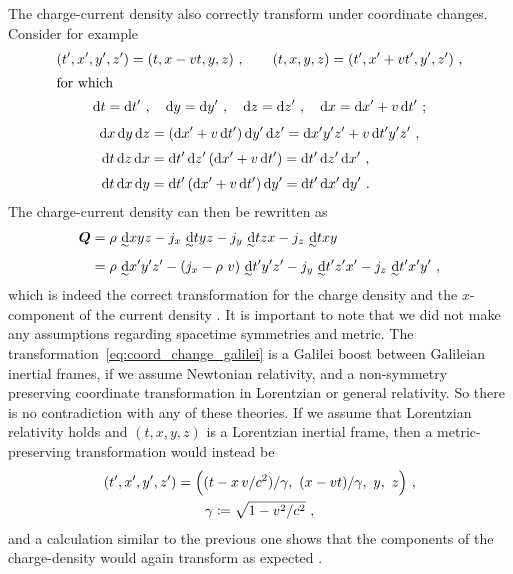 \documentclass[\ifafour a4paper,12pt,\else a5paper,10pt,\fi%
onecolumn,oneside,article,%
british%
]{memoir}
\theoremstyle{remark}
\theoremstyle{innote}
\newcommand*{\di}{\mathrm{d}}%
\newcommand*{\defd}{\coloneqq}
\renewcommand*{\|}[1][]{\nonscript\:#1\vert\nonscript\:\mathopen{}}
\newcommand*{\eqn}{eq.}%
\newcommand*{\eqns}{eqs}%
\newcommand*{\tw}[2][\scriptstyle\sim]{\smash[b]{\underset{\mathclap{{}^{#1}}}{#2}}}
\newcommand*{\ti}[1][\scriptstyle\sim]{\tw[#1]{\di}}
\begin{document}
The charge-current density also correctly transform under coordinate changes. Consider for example
\begin{gather}
  \label{eq:coord_change_galilei}
  (t', x', y', z') = (t, x-vt, y, z) \ ,
  \qquad
  (t, x, y, z) = (t', x'+vt', y', z') \ ,
  \\
  \shortintertext{for which}
  \begin{gathered}
  \di t = \di t' \ , \quad
  \di y = \di y' \ , \quad
  \di z = \di z' \ , \quad
  \di x = \di x' + v\,\di t' \ ;
\end{gathered}
\\[\jot]
\begin{aligned}
  \di x\, \di y\, \di z &=
  (\di x' + v\,\di t')\,\di y'\,\di z' =
  \di x'y'z' + v\,\di t'y'z' \ ,
  \\[\jot]
  \di t\, \di z\, \di x &=
  \di t'\, \di z'\, (\di x' + v\,\di t') =
  \di t'\, \di z'\, \di x' \ ,
  \\[\jot]
  \di t\, \di x\, \di y &=
  \di t'\, (\di x' + v\,\di t')\, \di y' =
  \di t'\, \di x'\, \di y' \ .
\end{aligned}
\end{gather}
The charge-current density can then be rewritten as
\begin{equation}
  \label{eq:charge-current_coordtransf}
  \begin{split}
\bm{Q} &=  \rho\ \ti xyz
  - j_{x}\ \ti tyz - j_{y}\ \ti tzx - j_{z}\ \ti txy
  \\[2\jot]
  &=\rho\ \ti x'y'z'
  - (j_{x} - \rho\ v)\ \ti t'y'z'
  - j_{y}\ \ti t'z'x' - j_{z}\ \ti t'x'y' \ ,
\end{split}
\end{equation}
which is indeed the correct transformation for the charge density and the $x$-component of the current density \autocites[\eqn~(5.8)]{kovetz2000}. It is important to note that we did not make any assumptions regarding spacetime symmetries and metric. The transformation~\eqref{eq:coord_change_galilei} is a Galilei boost between Galileian inertial frames, if we assume Newtonian relativity, and a non-symmetry preserving coordinate transformation in Lorentzian or general relativity. So there is no contradiction with any of these theories. If we assume that Lorentzian relativity holds and $(t,x,y,z)$ is a Lorentzian inertial frame, then a metric-preserving transformation would instead be
\begin{equation}
  \label{eq:coord_charge_lorentz}
  \begin{gathered}
  (t', x', y', z') =
  \Bigl((t-x\,v/c^{2})/\gamma,\ (x-vt)/\gamma,\ y,\ z \Bigr) \ ,
  \\ \gamma \defd \sqrt{1-v^{2}/c^{2}}\ ,
\end{gathered}
\end{equation}
and a calculation similar to the previous one shows that the components of the charge-density would again transform as expected  \autocites[\eqns~(12.17)--(12.18)]{kovetz2000}.
\end{document}
